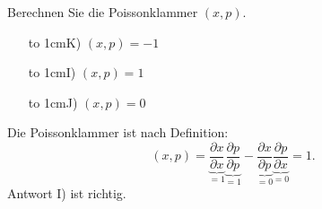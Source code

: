 Berechnen Sie die Poissonklammer $(x,p)$.
\begin{itemize}
\item[\hbox to 1cm{K)\hfill}] $(x,p)=-1$
\item[\hbox to 1cm{I)\hfill}] $(x,p)=1$
\item[\hbox to 1cm{J)\hfill}] $(x,p)=0$
\end{itemize}

\begin{loesung}
Die Poissonklammer ist nach Definition:
\[
(x,p)
=
\underbrace{\frac{\partial x}{\partial x}}_{=1}\underbrace{\frac{\partial p}{\partial p}}_{=1}
-
\underbrace{\frac{\partial x}{\partial p}}_{=0}\underbrace{\frac{\partial p}{\partial x}}_{=0}
=1.
\]
Antwort I) ist richtig.
\end{loesung}

